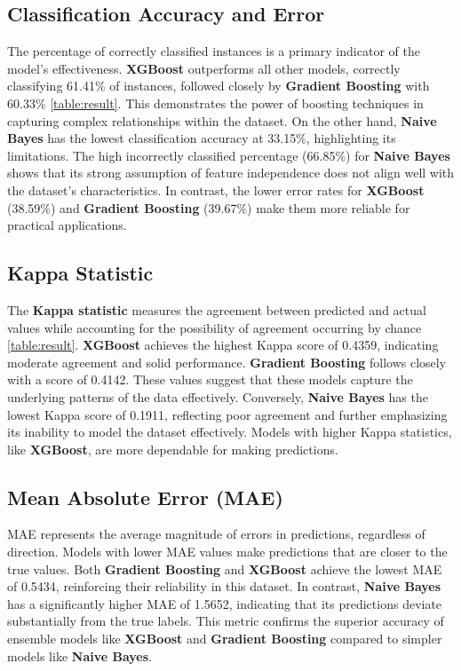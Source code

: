 \documentclass[pdflatex,sn-nature,Numbered]{sn-jnl}%
\theoremstyle{thmstyleone}%
\theoremstyle{thmstyletwo}%
\theoremstyle{thmstylethree}%
\begin{document}
\subsection{Classification Accuracy and Error}
The percentage of correctly classified instances is a primary indicator of the model's effectiveness. \textbf{XGBoost} outperforms all other models, correctly classifying 61.41\% of instances, followed closely by \textbf{Gradient Boosting} with 60.33\% \autoref{table:result}. This demonstrates the power of boosting techniques in capturing complex relationships within the dataset. On the other hand, \textbf{Naive Bayes} has the lowest classification accuracy at 33.15\%, highlighting its limitations. The high incorrectly classified percentage (66.85\%) for \textbf{Naive Bayes} shows that its strong assumption of feature independence does not align well with the dataset's characteristics. In contrast, the lower error rates for \textbf{XGBoost} (38.59\%) and \textbf{Gradient Boosting} (39.67\%) make them more reliable for practical applications.

\subsection{Kappa Statistic}
The \textbf{Kappa statistic} measures the agreement between predicted and actual values while accounting for the possibility of agreement occurring by chance \autoref{table:result}. \textbf{XGBoost} achieves the highest Kappa score of 0.4359, indicating moderate agreement and solid performance. \textbf{Gradient Boosting} follows closely with a score of 0.4142. These values suggest that these models capture the underlying patterns of the data effectively. Conversely, \textbf{Naive Bayes} has the lowest Kappa score of 0.1911, reflecting poor agreement and further emphasizing its inability to model the dataset effectively. Models with higher Kappa statistics, like \textbf{XGBoost}, are more dependable for making predictions.

\subsection{Mean Absolute Error (MAE)}
MAE represents the average magnitude of errors in predictions, regardless of direction. Models with lower MAE values make predictions that are closer to the true values. Both \textbf{Gradient Boosting} and \textbf{XGBoost} achieve the lowest MAE of 0.5434, reinforcing their reliability in this dataset. In contrast, \textbf{Naive Bayes} has a significantly higher MAE of 1.5652, indicating that its predictions deviate substantially from the true labels. This metric confirms the superior accuracy of ensemble models like \textbf{XGBoost} and \textbf{Gradient Boosting} compared to simpler models like \textbf{Naive Bayes}.
\end{document}
